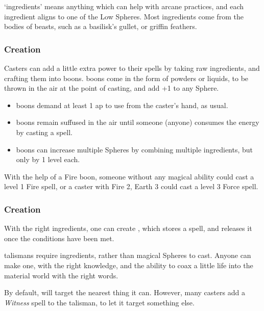 \begin{multicols}{2}

\noindent
`\Glspl{ingredient}' means anything which can help with arcane practices, and each \gls{ingredient} aligns to one of the Low Spheres.
Most \glspl{ingredient} come from the bodies of beasts, such as a basilisk's gullet, or griffin feathers.

\subsubsection{ Creation}

Casters can add a little extra power to their spells by taking raw \glspl{ingredient}, and crafting them into \glspl{boon}.
\Glspl{boon} come in the form of powders or liquids, to be thrown in the air at the point of casting, and add +1 to any Sphere.

\begin{itemize}
  \item
  \Glspl{boon} demand at least 1 \gls{ap} to use from the caster's hand, as usual.
  \item
  \Glspl{boon} remain suffused in the air until someone (anyone) consumes the energy by casting a spell.
  \item
  \Glspl{boon} can increase multiple Spheres by combining multiple \glspl{ingredient}, but only by 1 level each.
\end{itemize}

\noindent
With the help of a Fire \gls{boon}, someone without any magical ability could cast a level 1 Fire spell, or a caster with Fire 2, Earth 3 could cast a level 3 Force spell.

\subsubsection{ Creation}

With the right \glspl{ingredient}, one can create , which stores a spell, and releases it once the conditions have been met.

\Glspl{talisman} require \glspl{ingredient}, rather than magical Spheres to cast.
Anyone can make one, with the right knowledge, and the ability to coax a little life into the material world with the right words.

By default,  will target the nearest thing it can.
However, many casters add a \textit{Witness} spell to the \gls{talisman}, to let it target something else.


\end{multicols}

